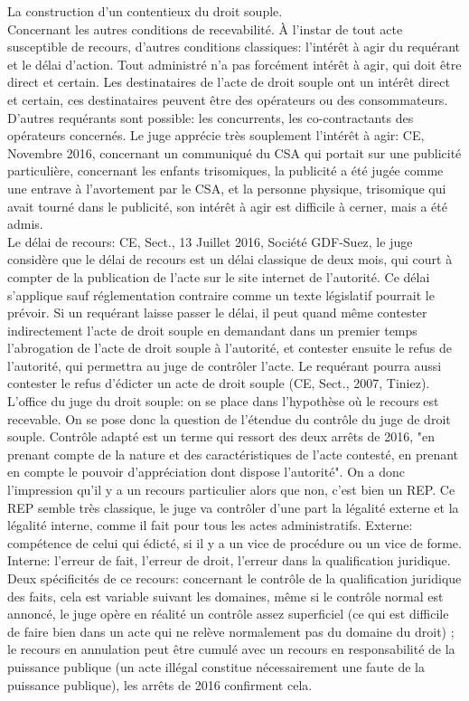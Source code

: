 \documentclass[10pt, a4paper, openany]{book}
\begin{document}
La construction d'un contentieux du droit souple. \\
Concernant les autres conditions de recevabilité. À l'instar de tout acte susceptible de recours, d'autres conditions classiques: l'intérêt à agir du requérant et le délai d'action. Tout administré n'a pas forcément intérêt à agir, qui doit être direct et certain. Les destinataires de l'acte de droit souple ont un intérêt direct et certain, ces destinataires peuvent être des opérateurs ou des consommateurs. D'autres requérants sont possible: les concurrents, les co-contractants des opérateurs concernés. Le juge apprécie très souplement l'intérêt à agir: CE, Novembre 2016, concernant un communiqué du CSA qui portait sur une publicité particulière, concernant les enfants trisomiques, la publicité a été jugée comme une entrave à l'avortement par le CSA, et la personne physique, trisomique qui avait tourné dans le publicité, son intérêt à agir est difficile à cerner, mais a été admis. \\
Le délai de recours: CE, Sect., 13 Juillet 2016, Société GDF-Suez, le juge considère que le délai de recours est un délai classique de deux mois, qui court à compter de la publication de l'acte sur le site internet de l'autorité. Ce délai s'applique sauf réglementation contraire comme un texte législatif pourrait le prévoir. Si un requérant laisse passer le délai, il peut quand même contester indirectement l'acte de droit souple en demandant dans un premier temps l'abrogation de l'acte de droit souple à l'autorité, et contester ensuite le refus de l'autorité, qui permettra au juge de contrôler l'acte. Le requérant pourra aussi contester le refus d'édicter un acte de droit souple (CE, Sect., 2007, Tiniez). \\
L'office du juge du droit souple: on se place dans l'hypothèse où le recours est recevable. On se pose donc la question de l'étendue du contrôle du juge de droit souple. Contrôle adapté est un terme qui ressort des deux arrêts de 2016, "en prenant compte de la nature et des caractéristiques de l'acte contesté, en prenant en compte le pouvoir d'appréciation dont dispose l'autorité". On a donc l'impression qu'il y a un recours particulier alors que non, c'est bien un REP. Ce REP semble très classique, le juge va contrôler d'une part la légalité externe et la légalité interne, comme il fait pour tous les actes administratifs. Externe: compétence de celui qui édicté, si il y a un vice de procédure ou un vice de forme. Interne: l'erreur de fait, l'erreur de droit, l'erreur dans la qualification juridique. Deux spécificités de ce recours: concernant le contrôle de la qualification juridique des faits, cela est variable suivant les domaines, même si le contrôle normal est annoncé, le juge opère en réalité un contrôle assez superficiel (ce qui est difficile de faire bien dans un acte qui ne relève normalement pas du domaine du droit) ; le recours en annulation peut être cumulé avec un recours en responsabilité de la puissance publique (un acte illégal constitue nécessairement une faute de la puissance publique), les arrêts de 2016 confirment cela. 
\end{document}
